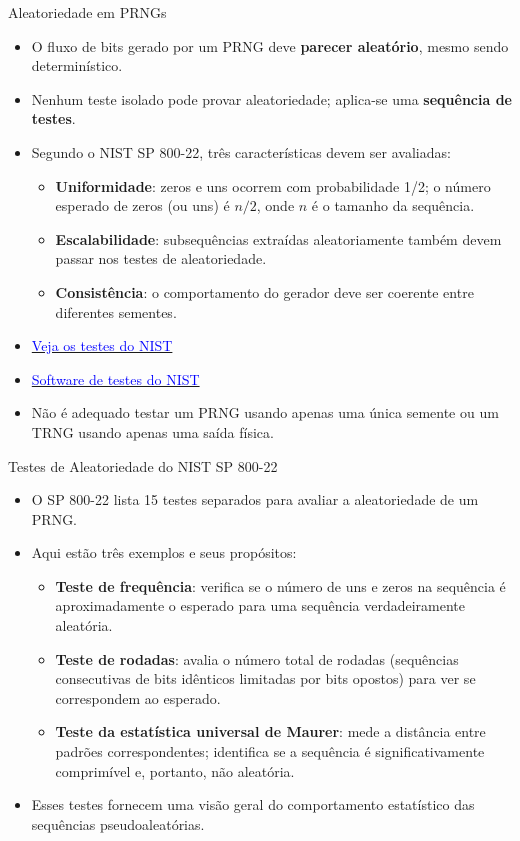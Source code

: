 \begin{frame}{Aleatoriedade em PRNGs}
\begin{itemize}
    \item O fluxo de bits gerado por um PRNG deve \textbf{parecer aleatório}, mesmo sendo determinístico.
    \item Nenhum teste isolado pode provar aleatoriedade; aplica-se uma \textbf{sequência de testes}.
    \item Segundo o NIST SP 800-22, três características devem ser avaliadas:
    \begin{itemize}
        \item \textbf{Uniformidade}: zeros e uns ocorrem com probabilidade 1/2; o número esperado de zeros (ou uns) é $n/2$, onde $n$ é o tamanho da sequência.
        \item \textbf{Escalabilidade}: subsequências extraídas aleatoriamente também devem passar nos testes de aleatoriedade.
        \item \textbf{Consistência}: o comportamento do gerador deve ser coerente entre diferentes sementes.
    \end{itemize}
        \item \href{https://csrc.nist.gov/pubs/sp/800/22/r1/upd1/final}{\textcolor{blue}{Veja os testes do NIST}}

        \item \href{https://csrc.nist.gov/projects/random-bit-generation/documentation-and-software}{\textcolor{blue}{Software de testes do NIST}}
    \item Não é adequado testar um PRNG usando apenas uma única semente ou um TRNG usando apenas uma saída física.
\end{itemize}
\end{frame}

\begin{frame}{Testes de Aleatoriedade do NIST SP 800-22}
\begin{itemize}
    \item O SP 800-22 lista 15 testes separados para avaliar a aleatoriedade de um PRNG.
    \item Aqui estão três exemplos e seus propósitos:
    \begin{itemize}
        \item \textbf{Teste de frequência}: verifica se o número de uns e zeros na sequência é aproximadamente o esperado para uma sequência verdadeiramente aleatória.
        \item \textbf{Teste de rodadas}: avalia o número total de rodadas (sequências consecutivas de bits idênticos limitadas por bits opostos) para ver se correspondem ao esperado.
        \item \textbf{Teste da estatística universal de Maurer}: mede a distância entre padrões correspondentes; identifica se a sequência é significativamente comprimível e, portanto, não aleatória.
    \end{itemize}
    \item Esses testes fornecem uma visão geral do comportamento estatístico das sequências pseudoaleatórias.
\end{itemize}
\end{frame}


